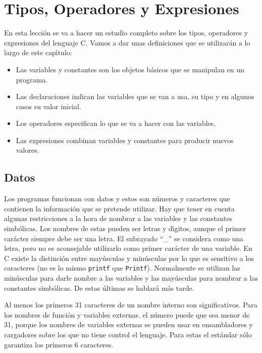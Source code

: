 \chapter{Tipos, Operadores y Expresiones}

\begin{textsf}
En esta lecci\'on se va a hacer un estudio completo sobre los tipos,
operadores y expresiones del lenguaje C. Vamos a dar unas definiciones que
se utilizar\'an a lo largo de este cap\'{\i}tulo:

\begin{itemize}

\item Las variables y constantes son los objetos b\'asicos que se manipulan en
un programa.

\item Las declaraciones indican las variables que se van a usa, su tipo y en
algunos casos su valor inicial.

\item Los operadores especifican lo que se va a hacer con las variables.

\item Las expresiones combinan variables y constantes para producir nuevos
valores.

\end{itemize}

\end{textsf}

\section{Datos}

Los programas funcionan con datos y estos son n\'umeros y caracteres que 
contienen la informaci\'on que se pretende utilizar. Hay que tener en cuenta
algunas restricciones a la hora de nombrar a las variables y las constantes
simb\'olicas. Los nombres de estas pueden ser letras y d\'{\i}gitos, aunque
el primer car\'acter siempre debe ser una letra. El subrayado ``\_'' se 
considera como una letra, pero no es aconsejable utilizarlo como primer
car\'acter de una variable. En C existe la distinci\'on entre may\'usculas y
min\'usculas por lo que es sensitivo a los caracteres (no es lo mismo 
\texttt{printf} que \texttt{Printf}). Normalmente se utilizan las min\'usculas
para darle nombre a las variables y las may\'usculas para nombrar a las 
constantes simb\'olicas. De estas \'ultimas se hablar\'a m\'as tarde.

Al menos los primeros 31 caracteres de un nombre interno son significativos.
Para los nombres de funci\'on y variables externas. el n\'umero puede que sea
menor de 31, porque los nombres de variables externas se pueden usar en
ensambladores y cargadores sobre los que no tiene control el lenguaje. Para 
estas el est\'andar s\'olo garantiza los primeros 6 caracteres.

